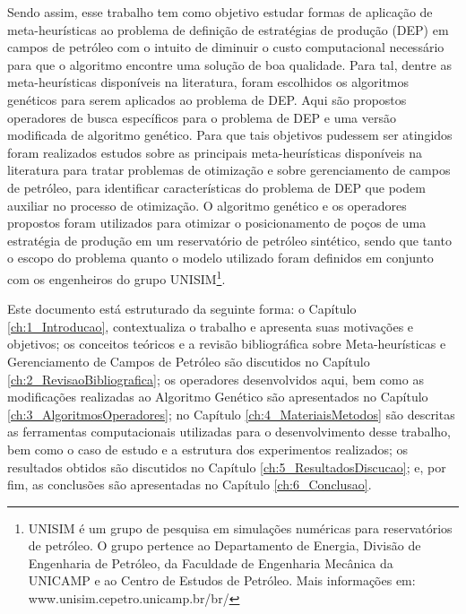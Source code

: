 Sendo assim, esse trabalho tem como objetivo estudar formas de aplicação de meta-heurísticas ao problema de definição de estratégias de produção (DEP) em campos de petróleo com o intuito de diminuir o custo computacional necessário para que o algoritmo encontre uma solução de boa qualidade. Para tal, dentre as meta-heurísticas disponíveis na literatura, foram escolhidos os algoritmos genéticos para serem aplicados ao problema de DEP. Aqui são propostos operadores de busca específicos para o problema de DEP e uma versão modificada de algoritmo genético. Para que tais objetivos pudessem ser atingidos foram realizados estudos sobre as principais meta-heurísticas disponíveis na literatura para tratar problemas de otimização e sobre gerenciamento de campos de petróleo, para identificar características do problema de DEP que podem auxiliar no processo de otimização. O algoritmo genético e os operadores propostos foram utilizados para otimizar o posicionamento de poços de uma estratégia de produção em um reservatório de petróleo sintético, sendo que tanto o escopo do problema quanto o modelo utilizado foram definidos em conjunto com os engenheiros do grupo UNISIM\footnote{UNISIM é um grupo de pesquisa em simulações numéricas para reservatórios de petróleo. O grupo pertence ao Departamento de Energia, Divisão de Engenharia de Petróleo, da Faculdade de Engenharia Mecânica da UNICAMP e ao Centro de Estudos de Petróleo. Mais informações em: www.unisim.cepetro.unicamp.br/br/}.

Este documento está estruturado da seguinte forma: o Capítulo \ref{ch:1_Introducao}, contextualiza o trabalho e apresenta suas motivações e objetivos; os conceitos teóricos e a revisão bibliográfica sobre Meta-heurísticas e Gerenciamento de Campos de Petróleo são discutidos no Capítulo \ref{ch:2_RevisaoBibliografica}; os operadores desenvolvidos aqui, bem como as modificações realizadas ao Algoritmo Genético são apresentados no Capítulo \ref{ch:3_AlgoritmosOperadores}; no Capítulo \ref{ch:4_MateriaisMetodos} são descritas as ferramentas computacionais utilizadas para o desenvolvimento desse trabalho, bem como o caso de estudo e a estrutura dos experimentos realizados; os resultados obtidos são discutidos no Capítulo \ref{ch:5_ResultadosDiscucao}; e, por fim, as conclusões são apresentadas no Capítulo \ref{ch:6_Conclusao}.